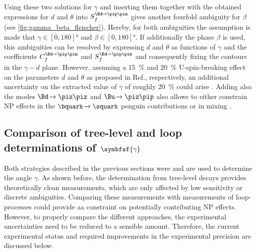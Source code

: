 Using these two solutions for $\gamma$ and inserting them together with the obtained expressions for $d$ and $\theta$ into $S_{f}^{\Bd\!\to\pip\pim}$ gives another fourfold ambiguity for $\beta$ (see \cref{fig:gamma_beta_fleischer}).
Hereby, for both ambiguities the assumption is made that $\gamma\in[0, 180]\si{\degree}$ and $\beta\in[0, 180]\si{\degree}$.
If additionally the phase $\beta$ is used, this ambiguities can be resolved by expressing $d$ and $\theta$ as functions of $\gamma$ and the \CP coefficients $C_{f}^{\Bd\!\to\pip\pim}$ and $S_{f}^{\Bd\!\to\pip\pim}$ and consequently fixing the contours in the $\gamma-d$ plane.
However, assuming a \SI{15}{\percent} and \SI{20}{\percent} U-spin-breaking effect on the parameters $d$ and $\theta$ as proposed in Ref.\cite{Fleischer:2010ib}, respectively, an additional uncertainty on the extracted value of $\gamma$ of roughly \SI{20}{\percent} could arise \cite{GammaInLoops_Fleischer2}.
Adding also the modes $\Bd\!\to\piz\piz$ and $\Bu\!\to\piz\pip$ also allows to either constrain \ac{NP} effects in the $\bquark\!\to\squark$ penguin contributions or in mixing \cite{GammaInLoops_Ciuchini}.

\subsection[head={Comparison of tree-level and loop determinations of $\gamma$},tocentry={Comparison of tree-level and loop determinations of $\gamma$}]{Comparison of tree-level and loop determinations of $\symbfsf{\gamma}$}

Both strategies described in the previous sections were and are used to determine the angle $\gamma$.
As shown before, the determination from tree-level decays provides theoretically clean measurements, which are only affected by low sensitivity or discrete ambiguities.
Comparing these measurements with measurements of loop-processes could provide aa constraint on potentially contributing \ac{NP} effects.
However, to properly compare the different approaches, the experimental uncertainties need to be reduced to a sensible amount.
Therefore, the current experimental status and required improvements in the experimental precision are discussed below.

